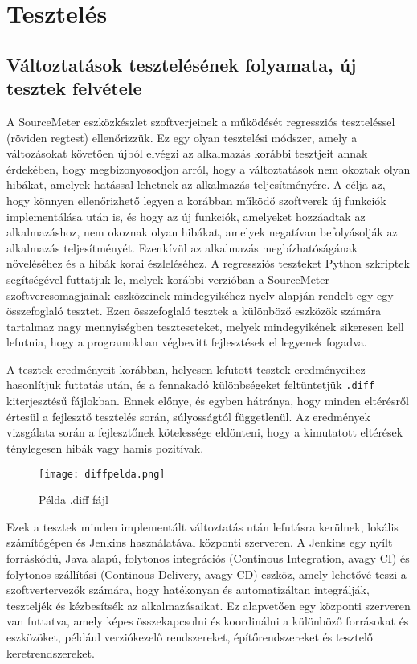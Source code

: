 \chapter{Tesztelés}
\label{chap:fejezet5}

\section{Változtatások tesztelésének folyamata, új tesztek felvétele}

A SourceMeter eszközkészlet szoftverjeinek a működését regressziós teszteléssel (röviden regtest) ellenőrizzük. Ez egy olyan tesztelési módszer, amely a változásokat követően újból elvégzi az alkalmazás korábbi tesztjeit annak érdekében, hogy megbizonyosodjon arról, hogy a változtatások nem okoztak olyan hibákat, amelyek hatással lehetnek az alkalmazás teljesítményére.
A célja az, hogy könnyen ellenőrizhető legyen a korábban működő szoftverek új funkciók implementálása után is, és hogy az új funkciók, amelyeket hozzáadtak az alkalmazáshoz, nem okoznak olyan hibákat, amelyek negatívan befolyásolják az alkalmazás teljesítményét. Ezenkívül az alkalmazás megbízhatóságának növeléséhez és a hibák korai észleléséhez.
A regressziós teszteket Python szkriptek segítségével futtatjuk le, melyek korábbi verzióban a SourceMeter szoftvercsomagjainak eszközeinek mindegyikéhez nyelv alapján rendelt egy-egy összefoglaló tesztet. Ezen összefoglaló tesztek a különböző eszközök számára tartalmaz nagy mennyiségben teszteseteket, melyek mindegyikének sikeresen kell lefutnia, hogy a programokban végbevitt fejlesztések el legyenek fogadva.

A tesztek eredményeit korábban, helyesen lefutott tesztek eredményeihez hasonlítjuk futtatás után, és a fennakadó különbségeket feltüntetjük \texttt{.diff} kiterjesztésű fájlokban. Ennek előnye, és egyben hátránya, hogy minden eltérésről értesül a fejlesztő tesztelés során, súlyosságtól függetlenül. Az eredmények vizsgálata során a fejlesztőnek kötelessége eldönteni, hogy a kimutatott eltérések ténylegesen hibák vagy hamis pozitívak.

\begin{figure}[!htbp]
    \caption{Példa .diff fájl}\label{fig:difffile}
    \centering
    \texttt{[image: diffpelda.png]}
\end{figure}

Ezek a tesztek minden implementált változtatás után lefutásra kerülnek, lokális számítógépen és Jenkins használatával központi szerveren. 
A Jenkins egy nyílt forráskódú, Java alapú, folytonos integrációs (Continous Integration, avagy CI) és folytonos szállítási (Continous Delivery, avagy CD) eszköz, amely lehetővé teszi a szoftvertervezők számára, hogy hatékonyan és automatizáltan integrálják, teszteljék és kézbesítsék az alkalmazásaikat. Ez alapvetően egy központi szerveren van futtatva, amely képes összekapcsolni és koordinálni a különböző forrásokat és eszközöket, például verziókezelő rendszereket, építőrendszereket és tesztelő keretrendszereket.

